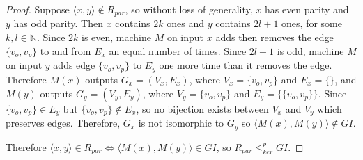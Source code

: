 \documentclass{article}
\theoremstyle{definition} \newtheorem{definition}[definition]{Definition}
\newcommand{\kr}{\leq^{p}_{ker}} %
\newcommand{\pair}[2]{\langle#1,#2\rangle} %
\begin{document}
\begin{proof}
  Suppose $\pair{x}{y}\notin R_{par}$, so without loss of generality, $x$ has
  even parity and $y$ has odd parity. Then $x$ contains $2k$ ones and $y$
  contains $2l+1$ ones, for some $k,l\in\mathbb{N}$. Since $2k$ is even,
  machine $M$ on input $x$ adds then removes the edge $\{v_o, v_p\}$ to and
  from $E_x$ an equal number of times. Since $2l+1$ is odd, machine $M$ on
  input $y$ adds edge $\{v_o, v_p\}$ to $E_y$ one more time than it removes the
  edge. Therefore $M(x)$ outputs $G_x=(V_x, E_x)$, where $V_x=\{v_o, v_p\}$ and
  $E_x=\{\}$, and $M(y)$ outputs $G_y=(V_y, E_y)$, where $V_y=\{v_o, v_p\}$ and
  $E_y=\{\{v_o, v_p\}\}$. Since $\{v_o, v_p\}\in E_y$ but $\{v_o, v_p\}\notin
  E_x$, so no bijection exists between $V_x$ and $V_y$ which preserves
  edges. Therefore, $G_x$ is not isomorphic to $G_y$ so
  $\pair{M(x)}{M(y)}\notin GI$.

  Therefore $\pair{x}{y}\in R_{par} \iff \pair{M(x)}{M(y)} \in GI$, so $R_{par}
  \kr GI$.
\end{proof}
\end{document}
